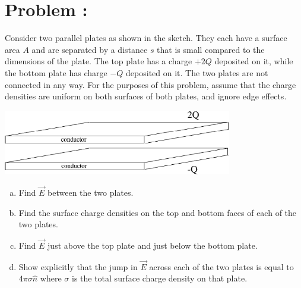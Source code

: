\documentclass[problems]{esg8022pset}
\begin{document}
\section{Problem \thesection: }
  Consider two parallel plates as shown in the sketch.  They each have a surface area $A$ and are separated by a distance $s$ that is small compared to the dimensions of the plate.  The top plate has a charge $+2Q$ deposited on it, while the bottom plate has charge $-Q$ deposited on it.  The two plates are not connected in any way.  For the purposes of this problem, assume that the charge densities are uniform on both surfaces of both plates, and ignore edge effects.
  \begin{center}\includegraphics[width=0.75\textwidth]{ps07_08}\end{center}
  \begin{enumerate}[(a)]
    \item Find $\vec E$ between the two plates.
    \item Find the surface charge densities on the top and bottom faces of each of the two plates.
    \item Find $\vec E$ just above the top plate and just below the bottom plate.
    \item Show explicitly that the jump in $\vec E$ across each of the two plates is equal to $4\pi \sigma \hat n$ where $\sigma$ is the total surface charge density on that plate.
  \end{enumerate}
\end{document}
